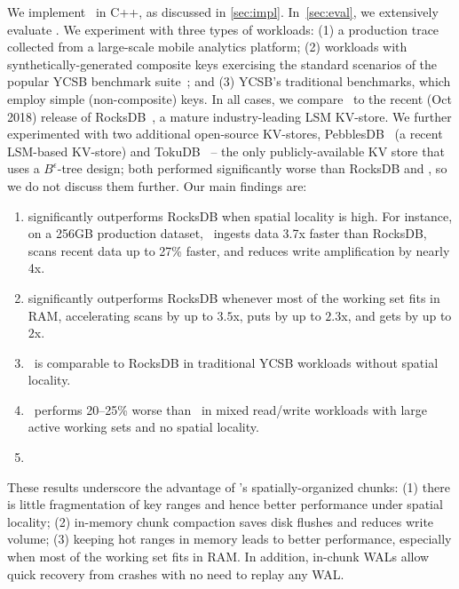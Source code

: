 We implement \sys\ in  C++, as discussed  in \cref{sec:impl}. 
In~\cref{sec:eval}, we extensively evaluate \sys. 
We experiment with three types of workloads: (1) a production trace collected from a large-scale mobile analytics platform; 
(2)  workloads with synthetically-generated composite keys exercising the standard scenarios of the popular YCSB benchmark suite~\cite{YCSB};
and (3)  YCSB's traditional benchmarks, which employ simple (non-composite) keys.  
In all cases, we compare \sys\ to the recent (Oct 2018) release of RocksDB~\cite{RocksDB}, a mature industry-leading LSM KV-store. 
We further experimented with two additional open-source KV-stores, PebblesDB~\cite{PebblesDB} (a recent LSM-based KV-store) and  
TokuDB~\cite{TokuDB} --  the only
publicly-available KV store that uses a $B^{\epsilon}$-tree design; both performed significantly worse than  RocksDB and \sys, 
so we do not discuss them further.
Our main findings are: 
\begin{enumerate} 
\item \sys\/ significantly outperforms RocksDB when spatial  locality is high.  
For instance, on a 256GB production dataset, \sys\ ingests data 3.7x faster than RocksDB,  scans recent  data up to 27\% faster, 
and reduces write amplification by nearly 4x. 
\item \sys\/ significantly outperforms RocksDB whenever most of the working set fits in RAM, 
accelerating scans by up to $3.5$x, puts by up to $2.3$x, and gets by up to $2$x. 
\item \sys\ is comparable to RocksDB in traditional YCSB workloads without spatial locality. 
\item \sys\ performs 20--25\% worse  than \sys\ in mixed read/write workloads with large active working sets and no spatial locality. 
\item {}
\end{enumerate}

These results underscore the advantage of \sys's spatially-organized chunks:
(1) there is little fragmentation of key ranges and hence better  performance under spatial locality; 
(2) in-memory chunk compaction saves disk flushes and reduces write volume;  
(3) keeping hot ranges in memory leads to better performance, especially when most of the working set fits in RAM.
In addition, in-chunk WALs  allow quick recovery from crashes with no need to replay any WAL.

